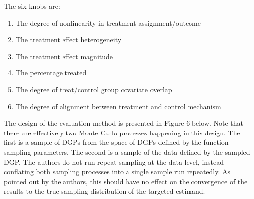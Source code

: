 \documentclass[../main.tex]{subfiles}
\begin{document}
\vspace{\baselineskip}
The six knobs are:\par


\vspace{\baselineskip}
\begin{enumerate}
	\item The degree of nonlinearity in treatment assignment/outcome\par

	\item The treatment effect heterogeneity\par

	\item The treatment effect magnitude\par

	\item The percentage treated\par

	\item The degree of treat/control group covariate overlap\par

	\item The degree of alignment between treatment and control mechanism 
\end{enumerate}\par


\vspace{\baselineskip}

\vspace{\baselineskip}
The design of the evaluation method is presented in Figure 6 below. Note that there are effectively two Monte Carlo processes happening in this design. The first is a sample of DGPs from the space of DGPs defined by the function sampling parameters. The second is a sample of the data defined by the sampled DGP. The authors do not run repeat sampling at the data level, instead conflating both sampling processes into a single sample run repeatedly. As pointed out by the authors, this should have no effect on the convergence of the results to the true sampling distribution of the targeted estimand.\par


\vspace{\baselineskip}


\end{document}
